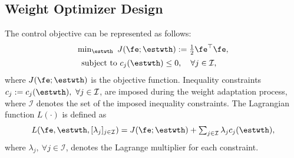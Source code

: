 \documentclass[letterpaper, journal]{IEEEtran}
\begin{document}
\subsection{Weight Optimizer Design}\label{sec:sub:weight optimizer}

The control objective can be represented as follows:
\begin{equation}
    \begin{matrix}
        \min_{\estwth} \ J(\fe;\estwth):= 
        \tfrac{1}{2} \fe^\top \fe
        ,
        \vspace{.5em}
        \\
        \begin{aligned}
        \text{subject to }&c_{j}(\estwth) 
        \le0, \quad \forall j\in\mathcal{I},
        \end{aligned}
    \end{matrix}
    \label{eq:opt:problem1}
\end{equation}
where $J(\fe;\estwth)$ is the objective function.
Inequality constraints $c_j:=c_j(\estwth),\ \forall j\in\mathcal{I}$, are imposed during the weight adaptation process, where $\mathcal I$ denotes the set of the imposed inequality constraints. 
The Lagrangian function $L(\cdot)$ is defined as
\begin{equation}
    L(
        \fe,\estwth,[\lambda_j]_{j\in\mathcal I}
    ) 
    = 
    J(\fe;\estwth) 
    + 
    \textstyle\sum_{j\in\mathcal I}
    \lambda_{j}
    c_{j}(\estwth)
    ,
    \label{eq:lagrangian}
\end{equation}
where $\lambda_j,\ \forall j\in\mathcal{I}$, denotes the Lagrange multiplier for each constraint.
\end{document}
